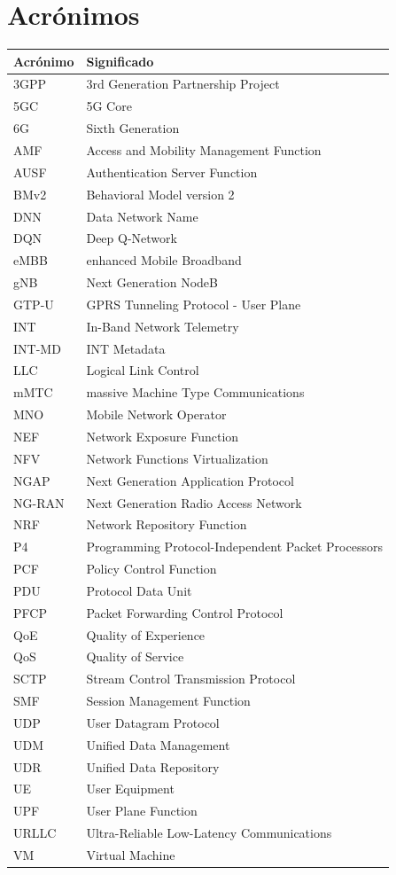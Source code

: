 \chapter*{Acrónimos}

\noindent
\begin{tabular}{p{3cm}p{11cm}}
\toprule
\textbf{Acrónimo} & \textbf{Significado} \\
\midrule
3GPP & 3rd Generation Partnership Project \\
5GC & 5G Core \\
6G & Sixth Generation \\
AMF & Access and Mobility Management Function \\
AUSF & Authentication Server Function \\
BMv2 & Behavioral Model version 2 \\
DNN & Data Network Name \\
DQN & Deep Q-Network \\
eMBB & enhanced Mobile Broadband \\
gNB & Next Generation NodeB \\
GTP-U & GPRS Tunneling Protocol - User Plane \\
INT & In-Band Network Telemetry \\
INT-MD & INT Metadata \\
LLC & Logical Link Control \\
mMTC & massive Machine Type Communications \\
MNO & Mobile Network Operator \\
NEF & Network Exposure Function \\
NFV & Network Functions Virtualization \\
NGAP & Next Generation Application Protocol \\
NG-RAN & Next Generation Radio Access Network \\
NRF & Network Repository Function \\
P4 & Programming Protocol-Independent Packet Processors \\
PCF & Policy Control Function \\
PDU & Protocol Data Unit \\
PFCP & Packet Forwarding Control Protocol \\
QoE & Quality of Experience \\
QoS & Quality of Service \\
SCTP & Stream Control Transmission Protocol \\
SMF & Session Management Function \\
UDP & User Datagram Protocol \\
UDM & Unified Data Management \\
UDR & Unified Data Repository \\
UE & User Equipment \\
UPF & User Plane Function \\
URLLC & Ultra-Reliable Low-Latency Communications \\
VM & Virtual Machine \\
\bottomrule
\end{tabular}
